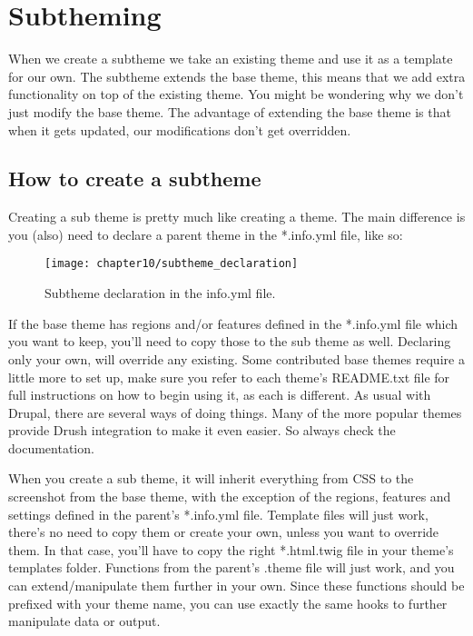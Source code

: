 \section{Subtheming}

When we create a subtheme we take an existing theme and use it as a template for our own. The subtheme extends the base theme, this means that we add extra functionality on top of the existing theme. You might be wondering why we don't just modify the base theme. The advantage of extending the base theme is that when it gets updated, our modifications don't get overridden. 

\subsection{How to create a subtheme}

Creating a sub theme is pretty much like creating a theme. The main difference is you (also)
need to declare a parent theme in the *.info.yml file, like so:

\begin{figure}[H]
	\centering
	\texttt{[image: chapter10/subtheme\_declaration]}
	\caption{Subtheme declaration in the info.yml file.}
	\label{fig:subtheme_declaration}
\end{figure}

If the base theme has regions and/or features defined in the *.info.yml file which you want to keep, you’ll need to copy those to the sub theme as well. Declaring only your own, will override any existing. Some contributed base themes require a little more to set up, make sure you refer to each theme’s README.txt file for full instructions on how to begin using it, as each is different. As usual with Drupal, there are several ways of doing things. Many of the more popular themes provide Drush integration to make it even easier. So always check the documentation.

When you create a sub theme, it will inherit everything from CSS to the screenshot from the base theme, with the exception of the regions, features and settings defined in the parent’s *.info.yml file. Template files will just work, there’s no need to copy them or create your own, unless you want to override them. In that case, you’ll have to copy the right *.html.twig file in your theme’s templates folder. Functions from the parent’s .theme file will just work, and you can extend/manipulate them further in your own. Since these functions should be prefixed with your theme name, you can use exactly the same hooks to further manipulate data or output.

